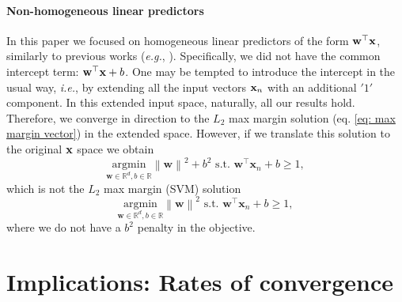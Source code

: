 \documentclass[twoside,11pt,english]{article}
\newcommand{\remove}[1]{}
\begin{document}
\paragraph{Non-homogeneous linear predictors} In this paper we focused on homogeneous linear predictors of the form $\mathbf{w}^\top \mathbf{x}$, similarly to previous works (\emph{e.g.}, \citet{Rosset2004,telgarsky2013margins}). Specifically, we did not have the common intercept term: $\mathbf{w}^\top \mathbf{x} + b$. One may be tempted to introduce the intercept in the usual way, \emph{i.e.}, by extending all the input vectors $\mathbf{x}_n$  with an additional $'1'$ component. In this extended input space, naturally, all our results hold. Therefore, we converge in direction to the $L_2$ max margin solution (eq. \ref{eq: max margin vector}) in the extended space. However, if we translate this solution to the original $\mathbf{x}$ space  we obtain $$
\underset{\mathbf{\mathbf{w}}\in\mathbb{R}^{d},b\in\mathbb{R}}{\mathrm{argmin}}\left\lVert \mathbf{w}\right\rVert ^{2}+b^2\,\,\mathrm{s.t.}\,\,\mathbf{w}^{\top}\mathbf{x}_{n}+b\geq1, $$
which is not the $L_2$ max margin (SVM) solution
$$
\underset{\mathbf{\mathbf{w}}\in\mathbb{R}^{d},b\in\mathbb{R}}{\mathrm{argmin}}\left\lVert \mathbf{w}\right\rVert ^{2}\,\,\mathrm{s.t.}\,\,\mathbf{w}^{\top}\mathbf{x}_{n}+b\geq1,$$
\remove{What rule does $b$ have in this equation? In https://openreview.net/pdf?id=ByfbnsA9Km they said (p.4 eq. (P1)) that the svm solution with intercept should solve this equation with $\wvec^\top\xn+b\ge 1$}where we do not have a $b^2$ penalty in the objective\remove{As stated above, I don't think this should be the only difference}.

\section{Implications: Rates of convergence\label{sec: convergence rates}}
\end{document}
